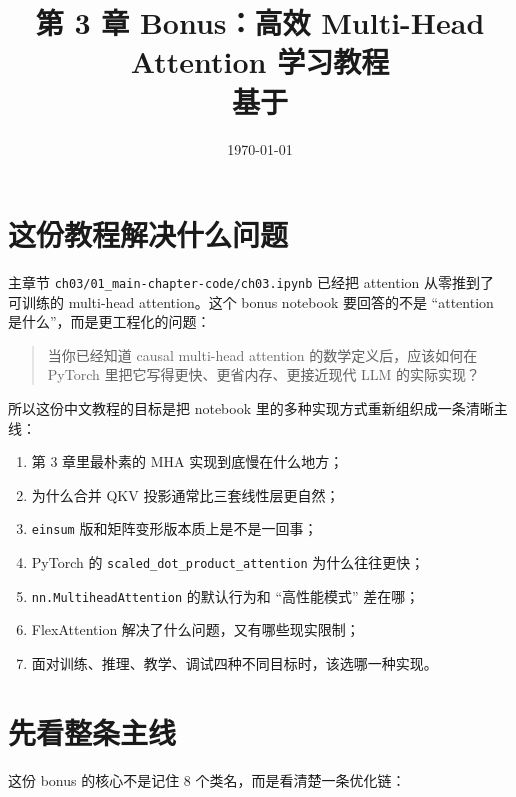 \documentclass[12pt,a4paper]{ctexart}
\title{第 3 章 Bonus：高效 Multi-Head Attention 学习教程\\\large 基于 \filepath{ch03/02\_bonus\_efficient-multihead-attention/mha-implementations.ipynb}}
\author{}
\date{\today}
\newcommand{\filepath}[1]{\texttt{#1}}
\newcommand{\code}[1]{\texttt{#1}}
\begin{document}
\maketitle
\tableofcontents
\newpage
\bigskip

\section{这份教程解决什么问题}

主章节 \filepath{ch03/01\_main-chapter-code/ch03.ipynb} 已经把 attention 从零推到了
可训练的 multi-head attention。这个 bonus notebook 要回答的不是
``attention 是什么''，而是更工程化的问题：

\begin{quote}
当你已经知道 causal multi-head attention 的数学定义后，应该如何在 PyTorch 里把它写得更快、更省内存、更接近现代 LLM 的实际实现？
\end{quote}

所以这份中文教程的目标是把 notebook 里的多种实现方式重新组织成一条清晰主线：

\begin{enumerate}
  \item 第 3 章里最朴素的 MHA 实现到底慢在什么地方；
  \item 为什么合并 QKV 投影通常比三套线性层更自然；
  \item \code{einsum} 版和矩阵变形版本质上是不是一回事；
  \item PyTorch 的 \code{scaled\_dot\_product\_attention} 为什么往往更快；
  \item \code{nn.MultiheadAttention} 的默认行为和 ``高性能模式'' 差在哪；
  \item FlexAttention 解决了什么问题，又有哪些现实限制；
  \item 面对训练、推理、教学、调试四种不同目标时，该选哪一种实现。
\end{enumerate}

\section{先看整条主线}

这份 bonus 的核心不是记住 8 个类名，而是看清楚一条优化链：
\end{document}
